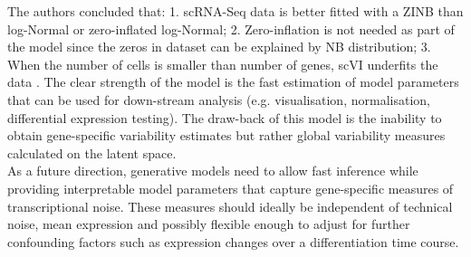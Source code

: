 The authors concluded that: 1. scRNA-Seq data is better fitted with a ZINB than log-Normal or zero-inflated log-Normal; 2. Zero-inflation is not needed as part of the model since the zeros in dataset can be explained by NB distribution; 3. When the number of cells is smaller than number of genes, scVI underfits the data \citep{Lopez2018}. The clear strength of the model is the fast estimation of model parameters that can be used for down-stream analysis (e.g. visualisation, normalisation, differential expression testing). The draw-back of this model is the inability to obtain gene-specific variability estimates but rather global variability measures calculated on the latent space. \\

As a future direction, generative models need to allow fast inference while providing interpretable model parameters that capture gene-specific measures of transcriptional noise. These measures should ideally be independent of technical noise, mean expression and possibly flexible enough to adjust for further confounding factors such as expression changes over a differentiation time course. 
 

